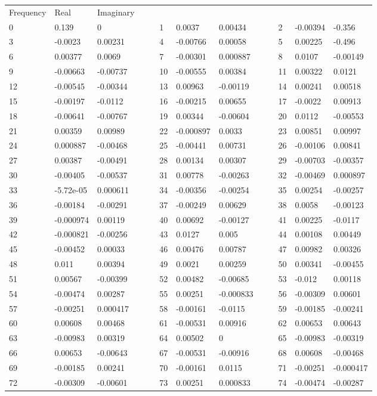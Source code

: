 \documentclass[english]{ctexart}
\providecommand{\tabularnewline}{\\}
\begin{document}
\begin{tabular}{lllllllllllll}
Frequency & Real & Imaginary &  &  &  &  &  &  &  &  &  & \tabularnewline
0 & 0.139 & 0 &  &  & 1 & 0.0037 & 0.00434 &  &  & 2 & -0.00394 & -0.356\tabularnewline
3 & -0.0023 & 0.00231 &  &  & 4 & -0.00766 & 0.00058 &  &  & 5 & 0.00225 & -0.496\tabularnewline
6 & 0.00377 & 0.0069 &  &  & 7 & -0.00301 & 0.000887 &  &  & 8 & 0.0107 & -0.00149\tabularnewline
9 & -0.00663 & -0.00737 &  &  & 10 & -0.00555 & 0.00384 &  &  & 11 & 0.00322 & 0.0121\tabularnewline
12 & -0.00545 & -0.00344 &  &  & 13 & 0.00963 & -0.00119 &  &  & 14 & 0.00241 & 0.00518\tabularnewline
15 & -0.00197 & -0.0112 &  &  & 16 & -0.00215 & 0.00655 &  &  & 17 & -0.0022 & 0.00913\tabularnewline
18 & -0.00641 & -0.00767 &  &  & 19 & 0.00344 & -0.00604 &  &  & 20 & 0.0112 & -0.00553\tabularnewline
21 & 0.00359 & 0.00989 &  &  & 22 & -0.000897 & 0.0033 &  &  & 23 & 0.00851 & 0.00997\tabularnewline
24 & 0.000887 & -0.00468 &  &  & 25 & -0.00441 & 0.00731 &  &  & 26 & -0.00106 & 0.00841\tabularnewline
27 & 0.00387 & -0.00491 &  &  & 28 & 0.00134 & 0.00307 &  &  & 29 & -0.00703 & -0.00357\tabularnewline
30 & -0.00405 & -0.00537 &  &  & 31 & 0.00778 & -0.00263 &  &  & 32 & -0.00469 & 0.000897\tabularnewline
33 & -5.72e-05 & 0.000611 &  &  & 34 & -0.00356 & -0.00254 &  &  & 35 & 0.00254 & -0.00257\tabularnewline
36 & -0.00184 & -0.00291 &  &  & 37 & -0.00249 & 0.00629 &  &  & 38 & 0.0058 & -0.00123\tabularnewline
39 & -0.000974 & 0.00119 &  &  & 40 & 0.00692 & -0.00127 &  &  & 41 & 0.00225 & -0.0117\tabularnewline
42 & -0.000821 & -0.00256 &  &  & 43 & 0.0127 & 0.005 &  &  & 44 & 0.00108 & 0.00449\tabularnewline
45 & -0.00452 & 0.00033 &  &  & 46 & 0.00476 & 0.00787 &  &  & 47 & 0.00982 & 0.00326\tabularnewline
48 & 0.011 & 0.00394 &  &  & 49 & 0.0021 & 0.00259 &  &  & 50 & 0.00341 & -0.00455\tabularnewline
51 & 0.00567 & -0.00399 &  &  & 52 & 0.00482 & -0.00685 &  &  & 53 & -0.012 & 0.00118\tabularnewline
54 & -0.00474 & 0.00287 &  &  & 55 & 0.00251 & -0.000833 &  &  & 56 & -0.00309 & 0.00601\tabularnewline
57 & -0.00251 & 0.000417 &  &  & 58 & -0.00161 & -0.0115 &  &  & 59 & -0.00185 & -0.00241\tabularnewline
60 & 0.00608 & 0.00468 &  &  & 61 & -0.00531 & 0.00916 &  &  & 62 & 0.00653 & 0.00643\tabularnewline
63 & -0.00983 & 0.00319 &  &  & 64 & 0.00502 & 0 &  &  & 65 & -0.00983 & -0.00319\tabularnewline
66 & 0.00653 & -0.00643 &  &  & 67 & -0.00531 & -0.00916 &  &  & 68 & 0.00608 & -0.00468\tabularnewline
69 & -0.00185 & 0.00241 &  &  & 70 & -0.00161 & 0.0115 &  &  & 71 & -0.00251 & -0.000417\tabularnewline
72 & -0.00309 & -0.00601 &  &  & 73 & 0.00251 & 0.000833 &  &  & 74 & -0.00474 & -0.00287\tabularnewline

\end{tabular}
\end{document}
